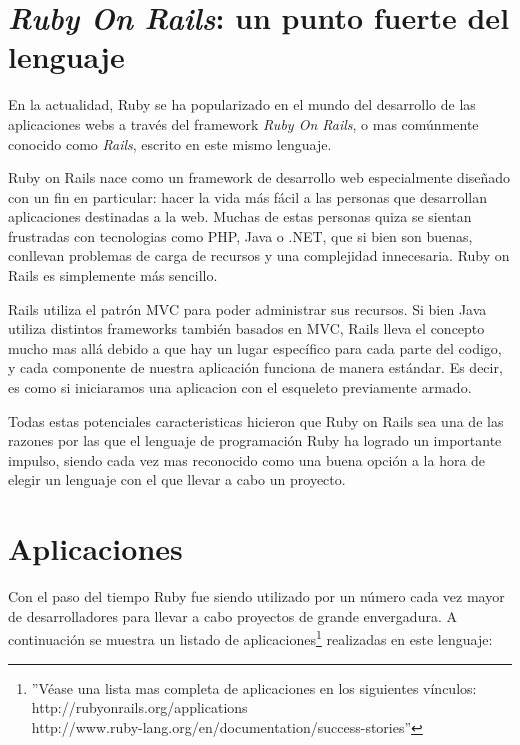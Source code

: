 \documentclass{article}
\begin{document}
\section{\textit{Ruby On Rails}: un punto fuerte del lenguaje}

	En la actualidad, Ruby se ha popularizado en el mundo del desarrollo de las aplicaciones webs a través del framework \textit{Ruby On Rails}, o mas comúnmente conocido como \textit{Rails}, escrito en este mismo lenguaje.
	\par
	Ruby on Rails nace como un framework de desarrollo web especialmente diseñado con un fin en particular: hacer la vida más fácil a las personas que desarrollan aplicaciones destinadas a la web. Muchas de estas personas quiza se sientan frustradas con tecnologias como PHP, Java o .NET, que si bien son buenas, conllevan problemas de carga de recursos y una complejidad innecesaria. Ruby on Rails es simplemente más sencillo.
	\par
	Rails utiliza el patrón MVC para poder administrar sus recursos. Si bien Java utiliza distintos frameworks también basados en MVC, Rails lleva el concepto mucho mas allá debido a que hay un lugar específico para cada parte del codigo, y cada componente de nuestra aplicación funciona de manera estándar. Es decir, es como si iniciaramos una aplicacion con el esqueleto previamente armado.
	\par
	Todas estas potenciales caracteristicas hicieron que Ruby on Rails sea una de las razones por las que el lenguaje de programación Ruby ha logrado un importante impulso, siendo cada vez mas reconocido como una buena opción a la hora de elegir un lenguaje con el que llevar a cabo un proyecto.
\bigskip




\section{Aplicaciones}

Con el paso del tiempo Ruby fue siendo utilizado por un número cada vez mayor de desarrolladores para llevar a cabo proyectos de grande envergadura. A continuación se muestra un listado de aplicaciones\footnote{''Véase una lista mas completa de aplicaciones en los siguientes vínculos: http://rubyonrails.org/applications\\http://www.ruby-lang.org/en/documentation/success-stories''} realizadas en este lenguaje:
\bigskip\\
\end{document}
